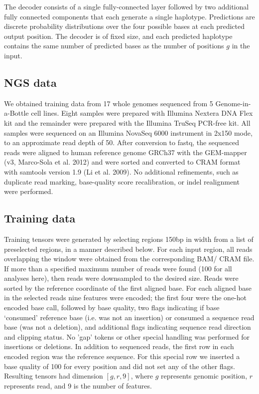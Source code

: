 \documentclass[]{article}
\begin{document}
The decoder consists of a single fully-connected layer followed by two additional fully connected components that each generate a single haplotype. Predictions are discrete probability distributions over the four possible bases at each predicted output position. The decoder is of fixed size, and each predicted haplotype contains the same number of predicted bases as the number of positions $g$ in the input. 


\subsection{NGS data}

We obtained training data from 17 whole genomes sequenced from 5 Genome-in-a-Bottle cell lines. Eight samples were prepared with Illumina Nextera DNA Flex kit and the remainder were prepared with the Illumina TruSeq PCR-free kit. All samples were sequenced on an Illumina NovaSeq 6000 instrument in 2x150 mode, to an approximate read depth of 50. After conversion to fastq, the sequenced reads were aligned to human reference genome GRCh37 with the GEM-mapper (v3, Marco-Sola et al. 2012) and were sorted and converted to CRAM format with samtools version 1.9 (Li et al. 2009). No additional refinements, such as duplicate read marking, base-quality score recalibration, or indel realignment were performed.

\subsection{Training data}

Training tensors were generated by selecting regions 150bp in width from a list of preselected regions, in a manner described below. For each input region, all reads overlapping the window were obtained from the corresponding BAM/ CRAM file. If more than a specified maximum number of reads were found (100 for all analyses here), then reads were downsampled to the desired size.  Reads were sorted by the reference coordinate of the first aligned base. For each aligned base in the selected reads nine features were encoded; the first four were the one-hot encoded base call, followed by base quality, two flags indicating if base `consumed' reference base (i.e. was not an insertion) or consumed a sequence read base (was not a deletion), and additional flags indicating sequence read direction and clipping status.  No 'gap' tokens or other special handling was performed for insertions or deletions. In addition to sequenced reads, the first row in each encoded region was the reference sequence. For this special row we inserted a base quality of 100 for every position and did not set any of the other flags. Resulting tensors had dimension $[g, r, 9]$, where $g$ represents genomic position, $r$ represents read, and 9 is the number of features. 
\end{document}
